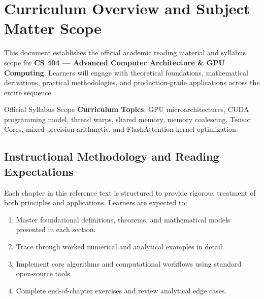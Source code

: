 \section{Curriculum Overview and Subject Matter Scope}

This document establishes the official academic reading material and syllabus scope for \textbf{CS 404 --- Advanced Computer Architecture \& GPU Computing}. Learners will engage with theoretical foundations, mathematical derivations, practical methodologies, and production-grade applications across the entire sequence.

\begin{InsightBox}{Official Syllabus Scope}
  \textbf{Curriculum Topics}: GPU microarchitectures, CUDA programming model, thread warps, shared memory, memory coalescing, Tensor Cores, mixed-precision arithmetic, and FlashAttention kernel optimization.
\end{InsightBox}

\subsection{Instructional Methodology and Reading Expectations}

Each chapter in this reference text is structured to provide rigorous treatment of both principles and applications. Learners are expected to:
\begin{enumerate}
  \item Master foundational definitions, theorems, and mathematical models presented in each section.
  \item Trace through worked numerical and analytical examples in detail.
  \item Implement core algorithms and computational workflows using standard open-source tools.
  \item Complete end-of-chapter exercises and review analytical edge cases.
\end{enumerate}

